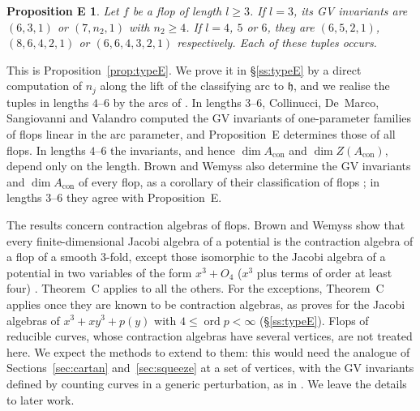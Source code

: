\documentclass[11pt]{amsart}
\makeatletter
\numberwithin{table}{section}
\numberwithin{figure}{section}
\numberwithin{equation}{section}
\theoremstyle{definition}
\theoremstyle{plain}
\newtheorem*{propE}{Proposition E}
\newcommand{\Acon}{A_{\mathrm{con}}}
\newcommand{\h}{\mathfrak{h}}
\DeclareMathOperator{\ord}{ord}
\renewcommand\paragraph{\@startsection{paragraph}{4}{\z@}{\medskipamount}{-.5em}{\normalfont\bfseries}}
\makeatother
\begin{document}
\begin{propE}
Let $f$ be a flop of length $l \ge 3$. If $l = 3$, its GV invariants are $(6, 3, 1)$ or $(7, n_2, 1)$ with $n_2 \ge 4$. If $l = 4$, $5$ or $6$, they are $(6, 5, 2, 1)$, $(8, 6, 4, 2, 1)$ or $(6, 6, 4, 3, 2, 1)$ respectively. Each of these tuples occurs.
\end{propE}

This is Proposition~\ref{prop:typeE}. We prove it in \S\ref{ss:typeE} by a direct computation of $n_j$ along the lift of the classifying arc to $\h$, and we realise the tuples in lengths $4$--$6$ by the arcs of \cite[Examples~5.4, 5.5]{K}. In lengths $3$--$6$, Collinucci, De~Marco, Sangiovanni and Valandro \cite{CDSV} computed the GV invariants of one-parameter families of flops linear in the arc parameter, and Proposition~E determines those of all flops. In lengths $4$--$6$ the invariants, and hence $\dim \Acon$ and $\dim Z(\Acon)$, depend only on the length. Brown and Wemyss also determine the GV invariants and $\dim \Acon$ of every flop, as a corollary of their classification of flops \cite[Cor~1.6]{BW26}; in lengths $3$--$6$ they agree with Proposition~E.

\paragraph{Scope.} The results concern contraction algebras of flops. Brown and Wemyss show that every finite-dimensional Jacobi algebra of a potential is the contraction algebra of a flop of a smooth $3$-fold, except those isomorphic to the Jacobi algebra of a potential in two variables of the form $x^3 + O_4$ ($x^3$ plus terms of order at least four) \cite[Cor~1.12]{BW}. Theorem~C applies to all the others. For the exceptions, Theorem~C applies once they are known to be contraction algebras, as \cite[Cor~4.12]{Pan} proves for the Jacobi algebras of $x^3 + xy^3 + p(y)$ with $4 \le \ord p < \infty$ (\S\ref{ss:typeE}). Flops of reducible curves, whose contraction algebras have several vertices, are not treated here. We expect the methods to extend to them: this would need the analogue of Sections~\ref{sec:cartan} and~\ref{sec:squeeze} at a set of vertices, with the GV invariants defined by counting curves in a generic perturbation, as in \cite[\S3]{NW}. We leave the details to later work.
\end{document}
